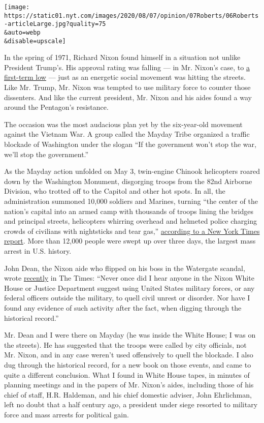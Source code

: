 \texttt{[image: https://static01.nyt.com/images/2020/08/07/opinion/07Roberts/06Roberts-articleLarge.jpg?quality=75\\\&auto=webp\\\&disable=upscale]}

In the spring of 1971, Richard Nixon found himself in a situation not
unlike President Trump's. His approval rating was falling --- in Mr.
Nixon's case, to
\href{https://www.nytimes.com/1971/04/01/archives/gallup-poll-finds-support-for-nixon-at-50-lowest-yet.html}{a
first-term low} --- just as an energetic social movement was hitting the
streets. Like Mr. Trump, Mr. Nixon was tempted to use military force to
counter those dissenters. And like the current president, Mr. Nixon and
his aides found a way around the Pentagon's resistance.

The occasion was the most audacious plan yet by the six-year-old
movement against the Vietnam War. A group called the Mayday Tribe
organized a traffic blockade of Washington under the slogan ``If the
government won't stop the war, we'll stop the government.''

As the Mayday action unfolded on May 3, twin-engine Chinook helicopters
roared down by the Washington Monument, disgorging troops from the 82nd
Airborne Division, who trotted off to the Capitol and other hot spots.
In all, the administration summoned 10,000 soldiers and Marines, turning
``the center of the nation's capital into an armed camp with thousands
of troops lining the bridges and principal streets, helicopters whirring
overhead and helmeted police charging crowds of civilians with
nightsticks and tear gas,''
\href{https://www.nytimes.com/1971/05/04/archives/empty-victory.html}{according
to a New York Times report}. More than 12,000 people were swept up over
three days, the largest mass arrest in U.S. history.

John Dean, the Nixon aide who flipped on his boss in the Watergate
scandal, wrote
\href{https://www.nytimes.com/2020/07/31/opinion/trump-nixon-authoritarianism.html}{recently}
in The Times: ``Never once did I hear anyone in the Nixon White House or
Justice Department suggest using United States military forces, or any
federal officers outside the military, to quell civil unrest or
disorder. Nor have I found any evidence of such activity after the fact,
when digging through the historical record.''

Mr. Dean and I were there on Mayday (he was inside the White House; I
was on the streets). He has suggested that the troops were called by
city officials, not Mr. Nixon, and in any case weren't used offensively
to quell the blockade. I also dug through the historical record, for a
new book on those events, and came to quite a different conclusion. What
I found in White House tapes, in minutes of planning meetings and in the
papers of Mr. Nixon's aides, including those of his chief of staff, H.R.
Haldeman, and his chief domestic adviser, John Ehrlichman, left no doubt
that a half century ago, a president under siege resorted to military
force and mass arrests for political gain.

